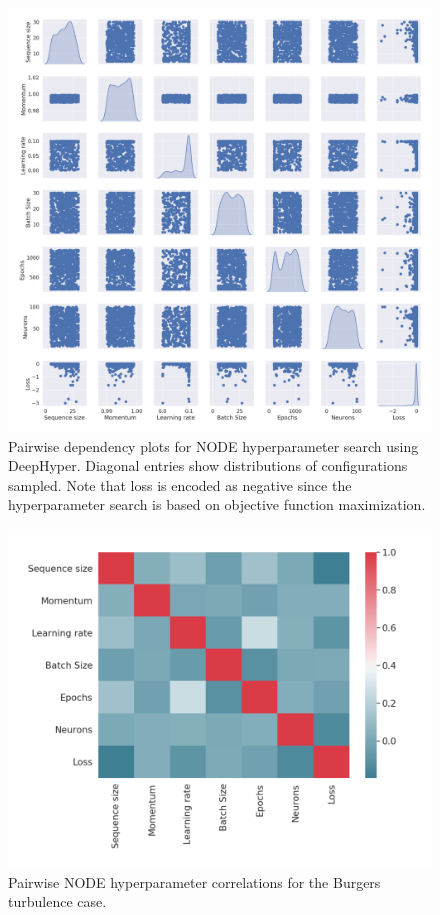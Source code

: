 \documentclass[preprint,12pt]{elsarticle}
\begin{document}
\begin{figure}
	\centering
	\includegraphics[width=\textwidth]{Figure_20.pdf}
	\caption{Pairwise dependency plots for NODE hyperparameter search using DeepHyper. Diagonal entries show distributions of configurations sampled. Note that loss is encoded as negative since the hyperparameter search is based on objective function maximization.}
	\label{Figure15}
\end{figure}

\begin{figure}
	\centering
	\includegraphics[width=\textwidth]{Figure_21.pdf}
	\caption{Pairwise NODE hyperparameter correlations for the Burgers turbulence case.}
	\label{Figure16}
\end{figure}
\end{document}
